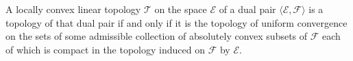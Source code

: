 A locally convex linear topology $\mathcal{T}$ on the space $\mathcal{E}$ of a dual pair $\langle \mathcal{E}, \mathcal{F} \rangle$ is a topology of that dual pair if and only if it is the topology of uniform convergence on the sets of some admissible collection of absolutely convex subsets of $\mathcal{F}$ each of which is compact in the topology induced on $\mathcal{F}$ by $\mathcal{E}$.
